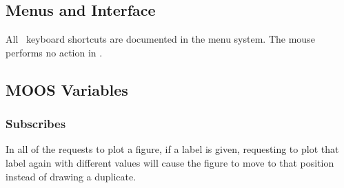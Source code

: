 \subsection{Menus and Interface}
All \pmv\ keyboard shortcuts are documented in the menu system.  The mouse performs no action in \pmv.

\subsection{MOOS Variables}
\subsubsection{Subscribes}
In all of the requests to plot a figure, if a label is given, requesting to plot that label again with different values will cause the figure to move to that position instead of drawing a duplicate.

